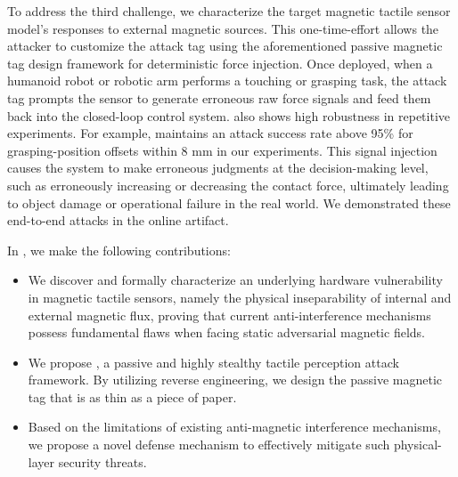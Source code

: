 To address the third challenge, we characterize the target magnetic tactile sensor model's responses to external magnetic sources. 
This one-time-effort allows the attacker to customize the attack tag using the aforementioned passive magnetic tag design framework for deterministic force injection. 
Once deployed, when a humanoid robot or robotic arm performs a touching or grasping task, the attack tag prompts the sensor to generate erroneous raw force signals and feed them back into the closed-loop control system. 
{\name} also shows high robustness in repetitive experiments. For example, {\name} maintains an attack success rate above 95\% for grasping-position offsets within 8 mm in our experiments.
This signal injection causes the system to make erroneous judgments at the decision-making level, such as erroneously increasing or decreasing the contact force, ultimately leading to object damage or operational failure in the real world.
We demonstrated these end-to-end attacks in the online artifact.

In {\name}, we make the following contributions:
\begin{itemize}
    \item We discover and formally characterize an underlying hardware vulnerability in magnetic tactile sensors, namely the physical inseparability of internal and external magnetic flux, proving that current anti-interference mechanisms possess fundamental flaws when facing static adversarial magnetic fields.
    
    \item We propose {\name}, a passive and highly stealthy tactile perception attack framework. By utilizing reverse engineering, we design the passive magnetic tag that is as thin as a piece of paper.
    
    \item Based on the limitations of existing anti-magnetic interference mechanisms, we propose a novel defense mechanism to effectively mitigate such physical-layer security threats.
\end{itemize}
